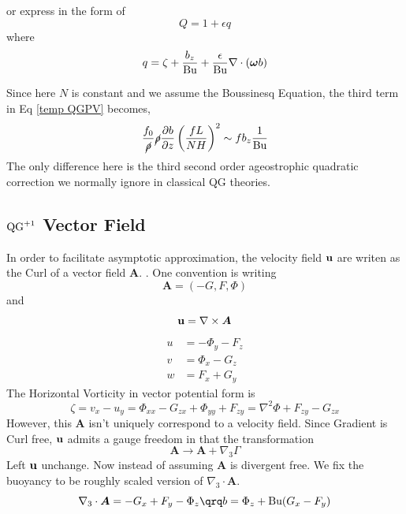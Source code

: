 \documentclass[../SQG_notes.tex]{subfiles}
\begin{document}
    or express in the form of 
    \[ Q = 1 + \epsilon q \]
    where 
    \begin{equation}
        q = \zeta + \frac{b_z}{\text{Bu}} + \frac{\epsilon}{\text{Bu}} \nabla \cdot (\bm{\omega} b) \label{dimensionless}
    \end{equation}
    \begin{explanation}
        Since here $N$ is constant and we assume the Boussinesq Equation, the third term in Eq \ref{temp QGPV} becomes,
        \[ \frac{f_0}{\cancel{\rho}} \cancel{\rho} \frac{\partial b}{\partial z} 
        \left( \frac{fL}{NH}\right)^2 \sim fb_z \frac{1}{\text{Bu}}\]
        The only difference here is the third second order ageostrophic quadratic correction we normally ignore in classical QG theories. 
    \end{explanation}

    \subsection{\texorpdfstring{$\text{QG}^{+1}$}{QG1} Vector Field}
    In order to facilitate asymptotic approximation, the velocity field $\mathbf{u}$ are writen as the Curl of a vector field $\bm{A}$. . One convention is writing 
    \begin{equation}
        \bm{A} = (-G, F, \Phi)
    \end{equation}
    and 
    \[ \mathbf{u} = \nabla \times \bm{A}\]
    \[
    \begin{aligned}
    u & =-\Phi_y-F_z \\
    v & =\Phi_x-G_z \\
    w & =F_x+G_y
    \end{aligned}
    \]
    The Horizontal Vorticity in vector potential form is 
    \begin{equation}    
        \zeta = v_x - u_y = \Phi_{xx} - G_{zx} + \Phi_{yy} + F_{zy} = \nabla^2 \Phi + F_{zy} - G_{zx} \label{vorticity in terms of potentials}
    \end{equation}
    However, this $\bm{A}$ isn't uniquely correspond to a velocity field. Since Gradient is Curl free, $\mathbf{u}$ admits a gauge freedom in that the transformation 
    \[ \bm{A} \rightarrow \bm{A} + \nabla_3 \Gamma\]
    Left $\mathbf{u}$ unchange. Now instead of assuming $\bm{A}$ is divergent free.  We fix the buoyancy to be roughly scaled version of $\nabla_3 \cdot \bm{A}$. 
    \[ \nabla_3 \cdot \bm{A} = -G_x + F_y - \Phi_z \qrq b = \Phi_z + \Bur(G_x - F_y)\]
\end{document}
